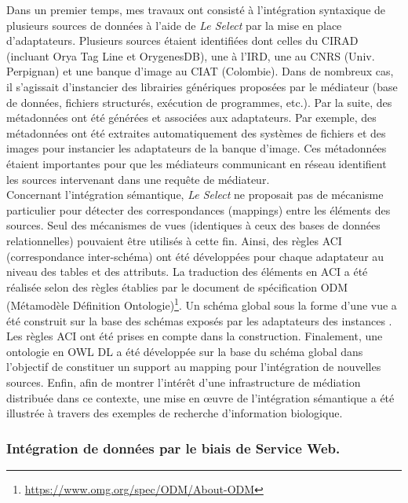 Dans un premier temps, mes travaux ont consisté à l'intégration syntaxique de plusieurs sources de données à l'aide de \textit{Le Select} par la mise en place d'adaptateurs. Plusieurs sources étaient identifiées dont celles du CIRAD (incluant Orya Tag Line et OrygenesDB), une à l'IRD, une au CNRS (Univ. Perpignan) et une banque d'image au CIAT (Colombie). Dans de nombreux cas, il s'agissait d'instancier des librairies génériques proposées par le médiateur (base de données, fichiers structurés, exécution de programmes, etc.). Par la suite, des métadonnées ont été générées et associées aux adaptateurs. Par exemple, des métadonnées ont été extraites automatiquement des systèmes de fichiers et des images pour instancier les adaptateurs de la banque d'image. Ces métadonnées étaient importantes pour que les médiateurs communicant en réseau identifient les sources intervenant dans une requête de médiateur.\\

Concernant l'intégration sémantique, \textit{Le Select} ne proposait pas de mécanisme particulier pour détecter des correspondances (mappings) entre les éléments des sources. Seul des mécanismes de vues (identiques à ceux des bases de données relationnelles) pouvaient être utilisés à cette fin.  Ainsi, des règles ACI (correspondance inter-schéma) ont été développées pour chaque adaptateur au niveau des tables et des attributs. La traduction des éléments en ACI a été réalisée selon des règles établies par le document de spécification ODM (Métamodèle Définition Ontologie)\footnote{\url{https://www.omg.org/spec/ODM/About-ODM}}. Un schéma global sous la forme d'une vue a été construit sur la base des schémas exposés par les adaptateurs des instances . Les règles ACI ont été prises en compte dans la construction. Finalement,  une ontologie en OWL DL a été développée sur la base du schéma global dans l'objectif de constituer un support au mapping pour l'intégration de nouvelles sources.  Enfin, afin de montrer l'intérêt d'une infrastructure de médiation distribuée dans ce contexte, une mise en \oe uvre de l'intégration sémantique a été illustrée à travers des exemples de recherche d'information biologique. \\

\subsubsection*{Intégration de données par le biais de Service Web.} 

